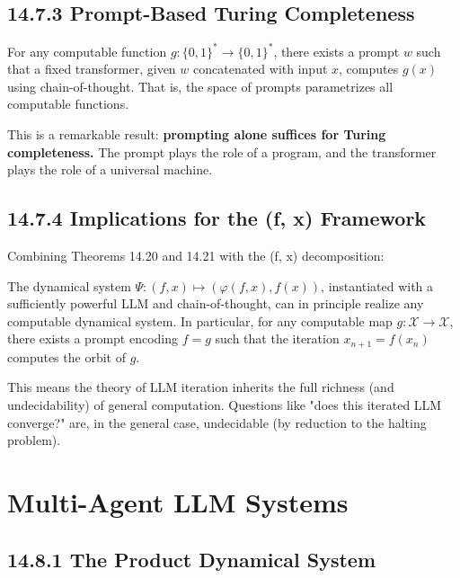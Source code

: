 \subsection{14.7.3 Prompt-Based Turing Completeness}

\begin{theorem}[Qiu et al., 2024]
For any computable function $g: \{ 0,1\}^* \to \{ 0,1\}^*$, there exists a prompt $w$ such that a fixed transformer, given $w$ concatenated with input $x$, computes $g(x)$ using chain-of-thought. That is, the space of prompts parametrizes all computable functions.

This is a remarkable result: \textbf{prompting alone suffices for Turing completeness.} The prompt plays the role of a program, and the transformer plays the role of a universal machine.
\end{theorem}

\subsection{14.7.4 Implications for the (f, x) Framework}

Combining Theorems 14.20 and 14.21 with the (f, x) decomposition:

\begin{corollary}
The dynamical system $\Psi: (f, x) \mapsto (\varphi(f, x), f(x))$, instantiated with a sufficiently powerful LLM and chain-of-thought, can in principle realize any computable dynamical system. In particular, for any computable map $g: \mathcal{X} \to \mathcal{X}$, there exists a prompt encoding $f = g$ such that the iteration $x_{n+1} = f(x_n)$ computes the orbit of $g$.

This means the theory of LLM iteration inherits the full richness (and undecidability) of general computation. Questions like "does this iterated LLM converge?" are, in the general case, undecidable (by reduction to the halting problem).
\end{corollary}



\section{Multi-Agent LLM Systems}

\subsection{14.8.1 The Product Dynamical System}

